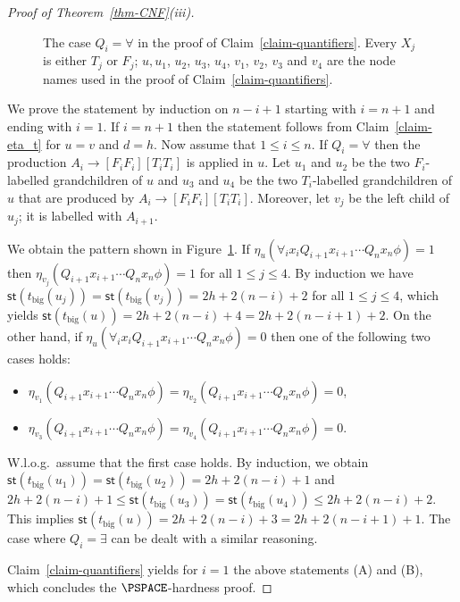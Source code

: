 \documentclass[a4paper,UKenglish,cleveref, autoref, thm-restate, numberwithinsect]{lipics-v2021}
\newcommand{\hs}{\mathsf{st}}
\begin{document}
\begin{proof}[Proof of Theorem~\ref{thm-CNF}(iii)]
\begin{figure}[t]
{}
\caption{The case $Q_i = \forall$ in the proof of Claim~\ref{claim-quantifiers}. 
Every $X_j$ is either $T_j$ or $F_j$; 
 $u, u_1$, $u_2$, $u_3$, $u_4$, $v_1$, $v_2$, $v_3$ and $v_4$ are the node names used in the proof of Claim~\ref{claim-quantifiers}.} \label{fig-claim-forall}
\end{figure}
\begin{claimproof}
We prove the statement by induction on $n-i+1$ starting with $i = n+1$ and ending with $i = 1$.
If $i = n+1$ then the statement follows from Claim~\ref{claim-eta_t} for $u=v$ and $d=h$.
Now assume that $1 \le i \le n$. If $Q_i = \forall$ then the production 
$A_i \to [F_i F_i ] [T_i T_i]$ is applied in $u$. 
Let $u_1$ and $u_2$ be the two $F_i$-labelled grandchildren of $u$ and $u_3$ and $u_4$ be the 
two $T_i$-labelled grandchildren of $u$ that are produced by $A_i \to [F_i F_i ] [T_i T_i]$. 
Moreover, let $v_j$ be the left child of $u_j$; it is labelled with $A_{i+1}$.

We obtain the pattern shown in Figure~\ref{fig-claim-forall}.
If $\eta_u(\forall_i x_i Q_{i+1} x_{i+1} \cdots Q_n x_n \phi) = 1$ then 
$\eta_{v_j}(Q_{i+1} x_{i+1} \cdots Q_n x_n \phi) = 1$ for all $1 \le j \le 4$. By induction we have
$\hs(t_{\text{big}}(u_j)) = \hs(t_{\text{big}}(v_j)) = 2h+2(n-i) + 2$ for all $1 \le j \le 4$, which yields
$\hs(t_{\text{big}}(u)) = 2h+2(n-i) + 4 = 2h+2(n-i+1) + 2$.
On the other hand, if $\eta_u(\forall_i x_i Q_{i+1} x_{i+1} \cdots Q_n x_n \phi) = 0$ then 
one of the following two cases holds: 
\begin{itemize}
\item $\eta_{v_1}(Q_{i+1} x_{i+1} \cdots Q_n x_n \phi) = \eta_{v_2}(Q_{i+1} x_{i+1} \cdots Q_n x_n \phi) = 0$,
\item $\eta_{v_3}(Q_{i+1} x_{i+1} \cdots Q_n x_n \phi) = \eta_{v_4}(Q_{i+1} x_{i+1} \cdots Q_n x_n \phi) = 0$.
\end{itemize}
W.l.o.g.~assume that the first case holds. By induction, we obtain 
$\hs(t_{\text{big}}(u_1)) =  \hs(t_{\text{big}}(u_2)) = 2h+2(n-i) + 1$ and 
$2h+2(n-i) + 1 \le \hs(t_{\text{big}}(u_3)) = \hs(t_{\text{big}}(u_4)) \le 2h+2(n-i) + 2$.
This implies  
$\hs(t_{\text{big}}(u)) = 2h+2(n-i) + 3 = 2h+2(n-i+1) + 1$. The case where $Q_i = \exists$ can be dealt with a similar
reasoning.
\end{claimproof} 
Claim~\ref{claim-quantifiers} yields for $i=1$ the above statements (A) and (B), which concludes the $\PSPACE$-hardness proof.
\end{proof}
\end{document}
